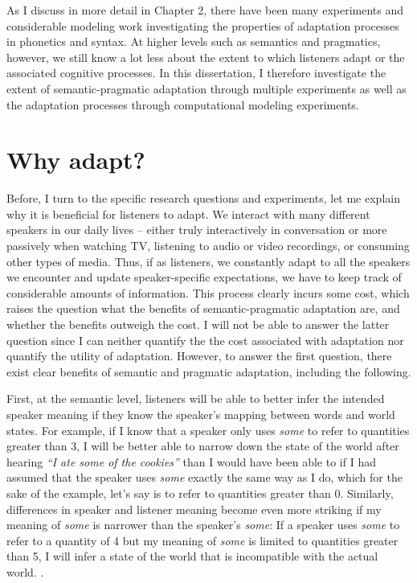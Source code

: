 As I discuss in more detail in Chapter 2, there have been many experiments and considerable modeling work investigating the properties of adaptation processes in phonetics and syntax. At higher levels such as semantics and pragmatics, however, we still know a lot less about the extent to which listeners adapt or the associated cognitive processes. In this dissertation, I therefore investigate the extent of semantic-pragmatic adaptation through multiple experiments as well as the adaptation processes through computational modeling experiments. 

\section{Why adapt?}

Before, I turn to the specific research questions and experiments, let me explain why it is beneficial for listeners to adapt. We interact with many different speakers in our daily lives -- either truly interactively in conversation or more passively when watching TV, listening to audio or video recordings, or consuming other types of media. Thus, if as listeners, we constantly adapt to all the speakers we encounter and update speaker-specific expectations, we have to keep track of considerable amounts of information. This process clearly incurs some cost, which raises the question what the benefits of semantic-pragmatic adaptation are, and whether the benefits outweigh the cost. I will not be able to answer the latter question since I can neither quantify the 
the cost associated with adaptation nor quantify the utility of adaptation. However, to answer the first question, there exist clear benefits of semantic and pragmatic adaptation, including the following.

First, at the semantic level, listeners will be able to better infer the intended speaker meaning if they know the speaker's mapping between words and world states. For example, if I know that a speaker only uses \emph{some} to refer to quantities greater than 3, I will be better able to narrow down the state of the world after hearing \emph{``I ate some of the cookies''} than I would have been able to if I had assumed that the speaker uses \emph{some} exactly the same way as I do, which for the sake of the example, let's say is to refer to quantities greater than 0. Similarly, differences in speaker and listener meaning become even more striking if my meaning of \emph{some} is narrower than the speaker's \emph{some}: If a speaker uses \emph{some} to refer to a quantity of 4 but my meaning of \emph{some} is limited to quantities greater than 5, I will infer a state of the world that is incompatible with the actual world. .

